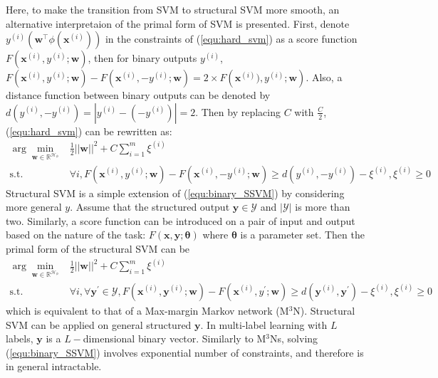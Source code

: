 Here, to make the transition from SVM to structural SVM more smooth, an alternative interpretaion  
of the primal form of SVM is presented. 
First, denote $y^{(i)} \left(\mathbf{w}^\top \phi (\mathbf{x}^{(i)})\right)$ in the constraints of (\ref{equ:hard_svm}) as a score function $F(\mathbf{x}^{(i)},y^{(i)}; \mathbf{w})$, then  
for binary outputs $y^{(i)}$, $F\left(\mathbf{x}^{(i)},y^{(i)}; \mathbf{w}\right)- F\left(\mathbf{x}^{(i)},-y^{(i)}; \mathbf{w}\right)=2\times F\left(\mathbf{x}^{(i)}),y^{(i)}; \mathbf{w}\right)$. 
Also, a distance function between binary outputs can be denoted by $d(y^{(i)},-y^{(i)})=|y^{(i)}-(-y^{(i)})|=2$. Then by replacing $C$ with $\frac{C}{2}$, (\ref{equ:hard_svm}) can be rewritten 
as:
\begin{equation}
\begin{array}{rl}
\displaystyle \arg\min_{ \mathbf{w} \in \mathbb{R}^{\mathcal{H_{\phi}}}}   & \frac{1}{2} ||\mathbf{w}||^2+C\sum_{i=1}^m \xi^{(i)} \\
                                                                       \text{s.t.} & \forall i, F\left(\mathbf{x}^{(i)},y^{(i)}; \mathbf{w}\right)- F\left(\mathbf{x}^{(i)},-y^{(i)}; \mathbf{w}\right) \geq d(y^{(i)},-y^{(i)})-\xi^{(i)}, \xi^{(i)} \geq 0 
\end{array}
\label{equ:binary_SSVM}
\end{equation}
Structural SVM \citep{StructSVM} is a simple extension of (\ref{equ:binary_SSVM}) by considering more general $y$. 
Assume that the structured output $\mathbf{y}\in\mathcal{Y}$ and $|\mathcal{Y}|$ is more than 
two. Similarly, a score function can be introduced on a pair of input and output based on the 
nature of the task: $F(\mathbf{x},\mathbf{y};\boldsymbol{\theta})$ where $\boldsymbol{\theta}$ is
a parameter set. Then the primal form of the structural SVM can be   
\begin{equation}
\begin{array}{rl}
\displaystyle \arg\min_{ \mathbf{w} \in \mathbb{R}^{\mathcal{H_{\phi}}}}   & \frac{1}{2} ||\mathbf{w}||^2+C\sum_{i=1}^m \xi^{(i)} \\
	\text{s.t.} & \forall i, \forall \mathbf{y}^\prime\in \mathcal{Y}, F\left(\mathbf{x}^{(i)},\mathbf{y}^{(i)}; \mathbf{w}\right)- F\left(\mathbf{x}^{(i)},y^{\prime}; \mathbf{w}\right)\geq d(\mathbf{y}^{(i)},\mathbf{y}^\prime)-\xi^{(i)}, \xi^{(i)} \geq 0 
\end{array}
\label{equ:binary_SSVM}
\end{equation}
which is equivalent to that of a Max-margin Markov network (M$^3$N).     
Structural SVM can be applied on general structured $\mathbf{y}$. In multi-label learning with $L$ labels, $\mathbf{y}$ is a $L-$dimensional binary vector. 
Similarly to M$^3$Ns, solving (\ref{equ:binary_SSVM}) involves exponential number of constraints, and therefore is in general intractable.        

